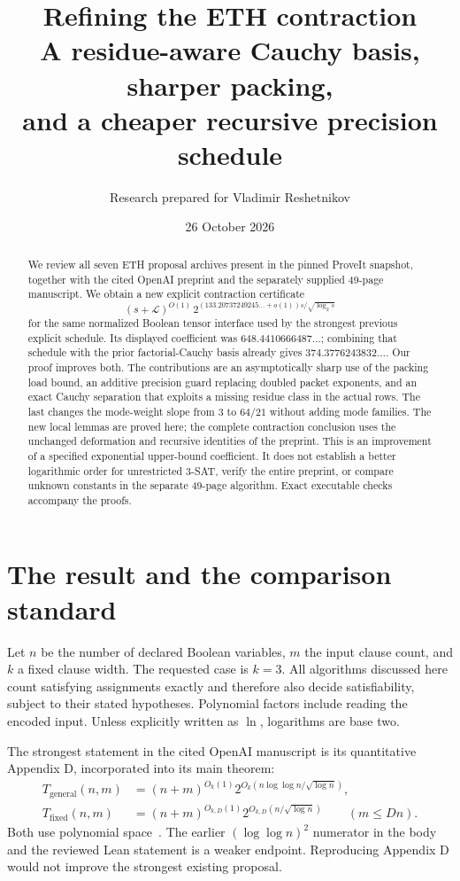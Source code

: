 \documentclass[11pt,letterpaper]{article}
\title{\vspace{-1.1em}Refining the ETH contraction\\[0.4em]
\large A residue-aware Cauchy basis, sharper packing,\\and a cheaper recursive precision schedule}
\author{Research prepared for Vladimir Reshetnikov}
\date{26 October 2026}
\theoremstyle{definition}\newtheorem{definition}[theorem]{Definition}
\theoremstyle{remark}\newtheorem{remark}[theorem]{Remark}
\newcommand{\LL}{\mathcal L}
\newcommand{\newconstant}{133.20737249245\ldots}
\begin{document}
\maketitle
\vspace{-0.8em}
\begin{abstract}
\noindent
We review all seven ETH proposal archives present in the pinned ProveIt
snapshot, together with the cited OpenAI preprint and the separately supplied
49-page manuscript. We obtain a new explicit contraction certificate
\[
 (s+\LL)^{O(1)}\,2^{(\newconstant+o(1))s/\sqrt{\log_2 s}}
\]
for the same normalized Boolean tensor interface used by the strongest
previous explicit schedule. Its displayed coefficient was $648.4410666487\ldots$;
combining that schedule with the prior factorial-Cauchy basis already gives
$374.3776243832\ldots$. Our proof improves both. The contributions are an
asymptotically sharp use of the packing load bound, an additive precision
guard replacing doubled packet exponents, and an exact Cauchy separation
that exploits a missing residue class in the actual rows. The last changes
the mode-weight slope from $3$ to $64/21$ without adding mode families.
The new local lemmas are proved here; the complete contraction conclusion
uses the unchanged deformation and recursive identities of the preprint.
This is an improvement of a specified exponential upper-bound coefficient.
It does not establish a better logarithmic order for unrestricted 3-SAT,
verify the entire preprint, or compare unknown constants in the separate
49-page algorithm. Exact executable checks accompany the proofs.
\end{abstract}

\section{The result and the comparison standard}
Let $n$ be the number of declared Boolean variables, $m$ the input clause
count, and $k$ a fixed clause width. The requested case is $k=3$. All
algorithms discussed here count satisfying assignments exactly and therefore
also decide satisfiability, subject to their stated hypotheses. Polynomial
factors include reading the encoded input. Unless explicitly written as
$\ln$, logarithms are base two.

The strongest statement in the cited OpenAI manuscript is its quantitative
Appendix D, incorporated into its main theorem:
\begin{align}
 T_{\mathrm{general}}(n,m)&=(n+m)^{O_k(1)}
  2^{O_k(n\log\log n/\sqrt{\log n})},\label{eq:general}\\
 T_{\mathrm{fixed}}(n,m)&=(n+m)^{O_{k,D}(1)}
  2^{O_{k,D}(n/\sqrt{\log n})}\qquad(m\le Dn).\label{eq:sparse}
\end{align}
Both use polynomial space~\cite{openai,reduction}. The earlier
$(\log\log n)^2$ numerator in the body and the reviewed Lean statement is
a weaker endpoint. Reproducing Appendix D would not improve the strongest
existing proposal.
\end{document}
